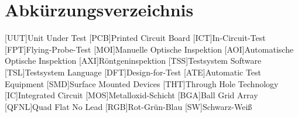 \section*{Abkürzungsverzeichnis}
    \begin{acronym}[QFNL]
        [UUT]{Unit Under Test}
        [PCB]{Printed Circuit Board}
        [ICT]{In-Circuit-Test}
        [FPT]{Flying-Probe-Test}
        [MOI]{Manuelle Optische Inspektion}
        [AOI]{Automatische Optische Inspektion}
        [AXI]{Röntgeninspektion}
        [TSS]{Testsystem Software}
        [TSL]{Testsystem Language}
        [DFT]{Design-for-Test}
        [ATE]{Automatic Test Equipment}
        [SMD]{Surface Mounted Devices}
        [THT]{Through Hole Technology}
        [IC]{Integrated Circuit}
        [MOS]{Metalloxid-Schicht}
        [BGA]{Ball Grid Array}
        [QFNL]{Quad Flat No Lead}
        [RGB]{Rot-Grün-Blau}
        [SW]{Schwarz-Weiß}
    \end{acronym}
